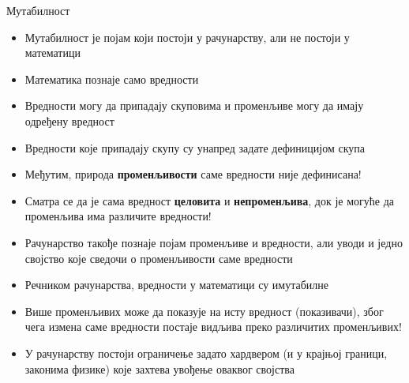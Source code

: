 \documentclass[xcolor=table]{beamer}
\begin{document}
    \begin{frame}[allowframebreaks]{Мутабилност}
        \begin{itemize}
            \item Мутабилност је појам који постоји у рачунарству, али не постоји у математици
            \item Математика познаје само вредности
            \item Вредности могу да припадају скуповима и променљиве могу да имају одређену вредност
            \item Вредности које припадају скупу су унапред задате дефиницијом скупа
            \item Међутим, природа \textbf{променљивости} саме вредности није дефинисана!
            \item Сматра се да је сама вредност \textbf{целовита} и \textbf{непроменљива}, док је могуће да променљива има различите вредности!
        \end{itemize}
        
        \framebreak
        
        \begin{itemize}
            \item Рачунарство такође познаје појам променљиве и вредности, али уводи и једно својство које сведочи о променљивости саме вредности
            \item Речником рачунарства, вредности у математици су имутабилне
            \item Више променљивих може да показује на исту вредност (показивачи), због чега измена саме вредности постаје видљива преко различитих променљивих!
            \item У рачунарству постоји ограничење задато хардвером (и у крајњој граници, законима физике) које захтева увођење оваквог својства
        \end{itemize}
        
        \framebreak
        

\end{frame}
\end{document}

